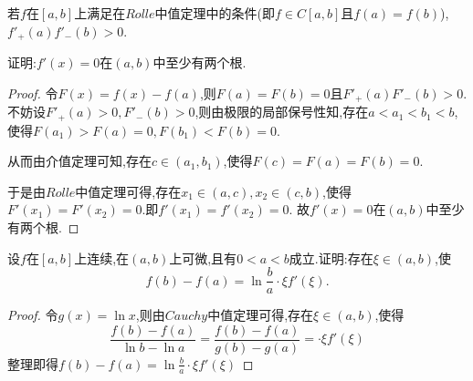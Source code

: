 \documentclass[lang=cn,newtx,10pt,scheme=chinese]{../Template/elegantbook}
\begin{document}
\begin{exercise}
    若$f$在$[a,b]$上满足在$Rolle$中值定理中的条件(即$f\in C[a,b]$且$f(a)=f(b)$),
$f'_+(a)f'_-(b)>0$.

证明:$f'(x)=0$在$(a,b)$中至少有两个根.

\begin{proof}
    令$F(x)=f(x)-f(a)$,则$F(a)=F(b)=0$且$F'_+(a)F'_-(b)>0$.不妨设$F'_+(a)>0,F'_-(b)>0$,则由极限的局部保号性知,存在$a<a_1<b_1<b$,使得$F(a_1)>F(a)=0,F(b_1)<F(b)=0$.
    
    从而由介值定理可知,存在$c\in(a_1,b_1)$,使得$F(c)=F(a)=F(b)=0$.

    于是由$Rolle$中值定理可得,存在$x_1\in(a,c),x_2\in(c,b)$,使得$F'(x_1)=F'(x_2)=0$.即$f'(x_1)=f'(x_2)=0$.
    故$f'(x)=0$在$(a,b)$中至少有两个根.
\end{proof}
\end{exercise}

\begin{exercise}
设$f$在$[a,b]$上连续,在$(a,b)$上可微,且有$0<a<b$成立.证明:存在$\xi\in(a,b)$,使
\begin{equation}
  f(b)-f(a)=\ln\frac{b}{a}\cdot\xi f'(\xi).
  \nonumber
\end{equation}
    \begin{proof}
        令$g(x)=\ln x$,则由$Cauchy$中值定理可得,存在$\xi\in(a,b)$,使得
        \begin{equation}
        \frac{f\left( b \right) -f\left( a \right)}{\ln b-\ln a}=\frac{f\left( b \right) -f\left( a \right)}{g\left( b \right) -g\left( a \right)}=\cdot\xi f'\left( \xi \right) 
            \nonumber
        \end{equation}
        整理即得$f\left( b \right) -f\left( a \right) =\ln \frac{b}{a}\cdot\xi f'\left( \xi \right) $
    \end{proof}
\end{exercise}
\end{document}
